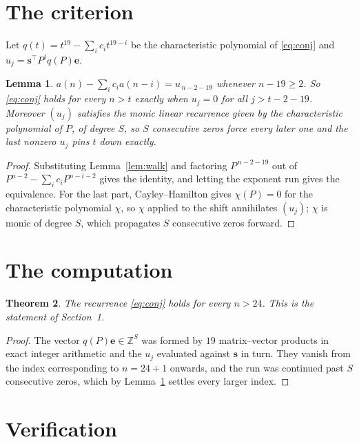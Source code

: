 \documentclass[11pt,a4paper]{article}
\theoremstyle{plain}
\newtheorem{theorem}{Theorem}
\newtheorem{lemma}[theorem]{Lemma}
\theoremstyle{definition}
\begin{document}
\section{The criterion}

Let $q(t)=t^{19}-\sum_i c_i t^{19-i}$ be the characteristic polynomial of
\eqref{eq:conj} and $u_j=\mathbf{s}^{\!\top}P^{j}q(P)\mathbf{e}$.

\begin{lemma}\label{lem:crit}
$a(n)-\sum_i c_i a(n-i)=u_{\,n-2-19}$ whenever $n-19\ge2$. So \eqref{eq:conj}
holds for every $n>t$ exactly when $u_j=0$ for all $j>t-2-19$. Moreover $(u_j)$
satisfies the monic linear recurrence given by the characteristic polynomial of $P$, of
degree $S$, so $S$ consecutive zeros force every later one and the last nonzero $u_j$ pins
$t$ down exactly.
\end{lemma}

\begin{proof}
Substituting Lemma~\ref{lem:walk} and factoring $P^{\,n-2-19}$ out of
$P^{n-2}-\sum_i c_i P^{n-i-2}$ gives the identity, and letting the exponent run gives the
equivalence. For the last part, Cayley--Hamilton gives $\chi(P)=0$ for the characteristic
polynomial $\chi$, so $\chi$ applied to the shift annihilates $(u_j)$; $\chi$ is monic of
degree $S$, which propagates $S$ consecutive zeros forward.
\end{proof}

\section{The computation}

\begin{theorem}
The recurrence \eqref{eq:conj} holds for every $n>24$. This is the statement of
Section~1.
\end{theorem}

\begin{proof}
The vector $q(P)\mathbf{e}\in\mathbb{Z}^{S}$ was formed by $19$ matrix--vector
products in exact integer arithmetic and the $u_j$ evaluated against $\mathbf{s}$ in turn.
They vanish from the index corresponding to $n=24+1$ onwards, and the run was continued
past $S$ consecutive zeros, which by Lemma~\ref{lem:crit} settles every larger index.
\end{proof}

\section{Verification}
\end{document}
